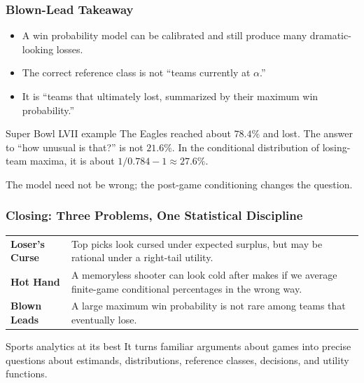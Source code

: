 \documentclass[aspectratio=169,professionalfonts]{beamer}
\begin{document}
\begin{frame}
\frametitle{Blown-Lead Takeaway}
\begin{itemize}
  \item A win probability model can be calibrated and still produce many dramatic-looking losses.
  \item The correct reference class is not ``teams currently at $\alpha$.''
  \item It is ``teams that ultimately lost, summarized by their maximum win probability.''
\end{itemize}

\vspace{2mm}
\begin{block}{Super Bowl LVII example}
The Eagles reached about $78.4\%$ and lost. The answer to ``how unusual is that?'' is not $21.6\%$.
In the conditional distribution of losing-team maxima, it is about $1/0.784 - 1 \approx 27.6\%$.
\end{block}

\vspace{2mm}
\centering
\Large
\alert{The model need not be wrong; the post-game conditioning changes the question.}
\end{frame}



\begin{frame}
\frametitle{Closing: Three Problems, One Statistical Discipline}
\begin{center}
\small
\begin{tabular}{>{\bfseries}p{}p{}}
Loser's Curse & Top picks look cursed under expected surplus, but may be rational under a right-tail utility.\\[2mm]
Hot Hand & A memoryless shooter can look cold after makes if we average finite-game conditional percentages in the wrong way.\\[2mm]
Blown Leads & A large maximum win probability is not rare among teams that eventually lose.\\
\end{tabular}
\end{center}

\vspace{4mm}
\begin{block}{Sports analytics at its best}
It turns familiar arguments about games into precise questions about estimands, distributions, reference classes, decisions, and utility functions.
\end{block}
\end{frame}
\end{document}

